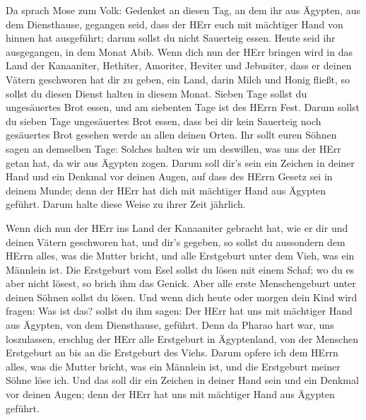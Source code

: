  Da sprach Mose zum Volk: Gedenket an diesen Tag, an dem ihr
aus Ägypten, aus dem Diensthause, gegangen seid, dass der HErr euch mit
mächtiger Hand von hinnen hat ausgeführt; darum sollst du nicht
Sauerteig essen.  Heute seid ihr ausgegangen, in dem Monat
Abib.  Wenn dich nun der HErr bringen wird in das Land der
Kanaaniter, Hethiter, Amoriter, Heviter und Jebusiter, dass er deinen
Vätern geschworen hat dir zu geben, ein Land, darin Milch und Honig
fließt, so sollst du diesen Dienst halten in diesem Monat. 
Sieben Tage sollst du ungesäuertes Brot essen, und am siebenten Tage ist
des HErrn Fest.  Darum sollst du sieben Tage ungesäuertes
Brot essen, dass bei dir kein Sauerteig noch gesäuertes Brot gesehen
werde an allen deinen Orten.  Ihr sollt euren Söhnen sagen
an demselben Tage: Solches halten wir um deswillen, was uns der HErr
getan hat, da wir aus Ägypten zogen.  Darum soll dir's sein
ein Zeichen in deiner Hand und ein Denkmal vor deinen Augen, auf dass
des HErrn Gesetz sei in deinem Munde; denn der HErr hat dich mit
mächtiger Hand aus Ägypten geführt.  Darum halte diese
Weise zu ihrer Zeit jährlich.

 Wenn dich nun der HErr ins Land der Kanaaniter gebracht
hat, wie er dir und deinen Vätern geschworen hat, und dir's gegeben,
 so sollst du aussondern dem HErrn alles, was die Mutter
bricht, und alle Erstgeburt unter dem Vieh, was ein Männlein ist.
 Die Erstgeburt vom Esel sollst du lösen mit einem Schaf;
wo du es aber nicht lösest, so brich ihm das Genick. Aber alle erste
Menschengeburt unter deinen Söhnen sollst du lösen.  Und
wenn dich heute oder morgen dein Kind wird fragen: Was ist das? sollst
du ihm sagen: Der HErr hat uns mit mächtiger Hand aus Ägypten, von dem
Diensthause, geführt.  Denn da Pharao hart war, uns
loszulassen, erschlug der HErr alle Erstgeburt in Ägyptenland, von der
Menschen Erstgeburt an bis an die Erstgeburt des Viehs. Darum opfere ich
dem HErrn alles, was die Mutter bricht, was ein Männlein ist, und die
Erstgeburt meiner Söhne löse ich.  Und das soll dir ein
Zeichen in deiner Hand sein und ein Denkmal vor deinen Augen; denn der
HErr hat uns mit mächtiger Hand aus Ägypten geführt.

